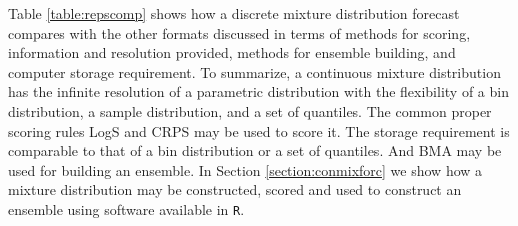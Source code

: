 \documentclass[11pt,notitlepage]{isuthesis}
\begin{document}
Table \ref{table:repscomp} shows how a discrete mixture distribution forecast 
compares with the other formats discussed in terms of methods for scoring,
information and resolution provided, methods for ensemble building, and computer
storage requirement. To summarize, a continuous mixture distribution has the 
infinite resolution of a parametric distribution with the flexibility of a bin
distribution, a sample distribution, and a set of quantiles. The common proper
scoring rules LogS and CRPS may be used to score it. The storage requirement is
comparable to that of a bin distribution or a set of quantiles. And BMA may be 
used for building an ensemble.
In Section
\ref{section:conmixforc} we show how a mixture distribution may be constructed,
scored and used to construct an ensemble using software available in 
\texttt{R}.
\end{document}
